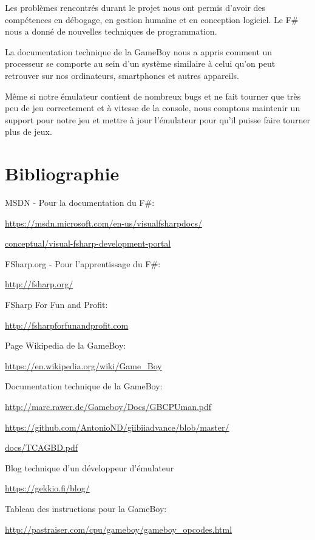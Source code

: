 \documentclass[12pt, a4paper]{article}
\begin{document}
Les problèmes rencontrés durant le projet nous ont permis d'avoir des compétences en débogage, en gestion humaine et en conception logiciel. 
Le F\# nous a donné de nouvelles techniques de programmation. 

\bigskip
La documentation technique de la GameBoy nous a appris comment un processeur se comporte au sein d'un système similaire à celui qu'on peut retrouver sur nos ordinateurs, smartphones et autres appareils.

\bigskip
Même si notre émulateur contient de nombreux bugs et ne fait tourner que très peu de jeu correctement et à vitesse de la console, nous comptons maintenir un support pour notre jeu et mettre à jour l'émulateur pour qu'il puisse faire tourner plus de jeux.




\pagebreak
\section{Bibliographie}
MSDN - Pour la documentation du F\#:

\url{https://msdn.microsoft.com/en-us/visualfsharpdocs/}

\url{conceptual/visual-fsharp-development-portal}

\bigskip
FSharp.org - Pour l'apprentissage du F\#:

\url{http://fsharp.org/}

\bigskip
FSharp For Fun and Profit:

\url{http://fsharpforfunandprofit.com}

\bigskip

Page Wikipedia de la GameBoy:

\url{https://en.wikipedia.org/wiki/Game_Boy}

\bigskip

Documentation technique de la GameBoy:

\url{http://marc.rawer.de/Gameboy/Docs/GBCPUman.pdf}

\medskip

\url{https://github.com/AntonioND/giibiiadvance/blob/master/}

\url{docs/TCAGBD.pdf}

\bigskip
Blog technique d'un développeur d'émulateur

\url{https://gekkio.fi/blog/}

\bigskip
Tableau des instructions pour la GameBoy:

\url{http://pastraiser.com/cpu/gameboy/gameboy\_opcodes.html}
\end{document}
